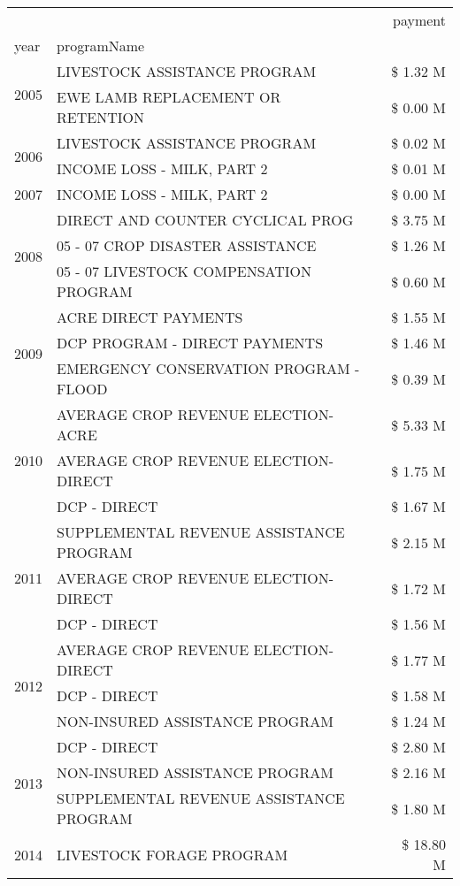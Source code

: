 \begin{tabular}{llr}
\toprule
 &  & payment \\
year & programName &  \\
\midrule
\multirow[t]{2}{*}{2005} & LIVESTOCK ASSISTANCE PROGRAM & \$ 1.32 M \\
 & EWE LAMB REPLACEMENT OR RETENTION & \$ 0.00 M \\
\cline{1-3}
\multirow[t]{2}{*}{2006} & LIVESTOCK ASSISTANCE PROGRAM & \$ 0.02 M \\
 & INCOME LOSS - MILK, PART 2 & \$ 0.01 M \\
\cline{1-3}
2007 & INCOME LOSS - MILK, PART 2 & \$ 0.00 M \\
\cline{1-3}
\multirow[t]{3}{*}{2008} & DIRECT AND COUNTER CYCLICAL PROG & \$ 3.75 M \\
 & 05 - 07 CROP DISASTER ASSISTANCE & \$ 1.26 M \\
 & 05 - 07 LIVESTOCK COMPENSATION PROGRAM & \$ 0.60 M \\
\cline{1-3}
\multirow[t]{3}{*}{2009} & ACRE DIRECT PAYMENTS & \$ 1.55 M \\
 & DCP PROGRAM - DIRECT PAYMENTS & \$ 1.46 M \\
 & EMERGENCY CONSERVATION PROGRAM - FLOOD & \$ 0.39 M \\
\cline{1-3}
\multirow[t]{3}{*}{2010} & AVERAGE CROP REVENUE ELECTION-ACRE & \$ 5.33 M \\
 & AVERAGE CROP REVENUE ELECTION-DIRECT & \$ 1.75 M \\
 & DCP - DIRECT & \$ 1.67 M \\
\cline{1-3}
\multirow[t]{3}{*}{2011} & SUPPLEMENTAL REVENUE ASSISTANCE PROGRAM & \$ 2.15 M \\
 & AVERAGE CROP REVENUE ELECTION-DIRECT & \$ 1.72 M \\
 & DCP - DIRECT & \$ 1.56 M \\
\cline{1-3}
\multirow[t]{3}{*}{2012} & AVERAGE CROP REVENUE ELECTION-DIRECT & \$ 1.77 M \\
 & DCP - DIRECT & \$ 1.58 M \\
 & NON-INSURED ASSISTANCE PROGRAM & \$ 1.24 M \\
\cline{1-3}
\multirow[t]{3}{*}{2013} & DCP - DIRECT & \$ 2.80 M \\
 & NON-INSURED ASSISTANCE PROGRAM & \$ 2.16 M \\
 & SUPPLEMENTAL REVENUE ASSISTANCE PROGRAM & \$ 1.80 M \\
\cline{1-3}
\multirow[t]{3}{*}{2014} & LIVESTOCK FORAGE PROGRAM & \$ 18.80 M \\

\end{tabular}

